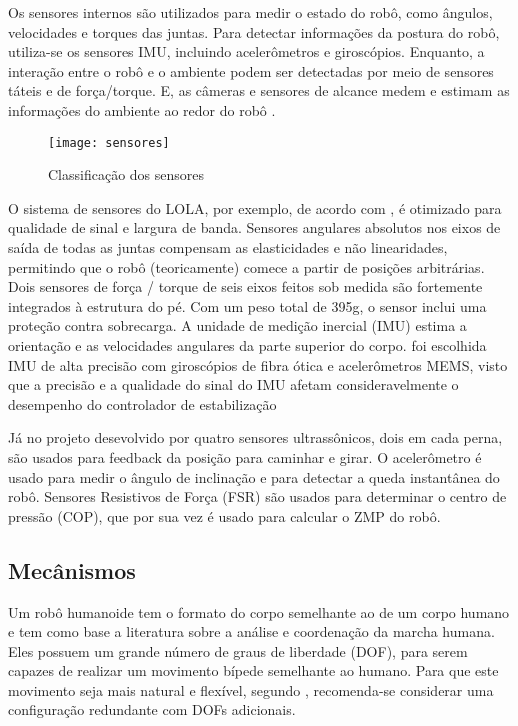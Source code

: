 Os sensores internos são utilizados para medir o estado do robô, como ângulos, velocidades e torques das juntas. Para detectar informações da postura do robô, utiliza-se os sensores IMU, incluindo acelerômetros e giroscópios. Enquanto, a interação entre o robô e o ambiente podem ser detectadas por meio de sensores táteis e de força/torque. E, as câmeras e sensores de alcance medem e estimam as informações do ambiente ao redor do robô \cite{Ambarish20181}.

\begin{figure} [H]
    \centering
    \caption{Classificação dos sensores}
    \texttt{[image: sensores]}
    \label{fig:sensors}
\end{figure}

O sistema de sensores do LOLA, por exemplo, de acordo com ,  é otimizado para qualidade de sinal e largura de banda. Sensores angulares absolutos nos eixos de saída de todas as juntas compensam as elasticidades e não linearidades, permitindo que o robô (teoricamente) comece a partir de posições arbitrárias. Dois sensores de força / torque de seis eixos feitos sob medida são fortemente integrados à estrutura do pé. Com um peso total de 395g, o sensor inclui uma proteção contra sobrecarga. A unidade de medição inercial (IMU) estima a orientação e as velocidades angulares da parte superior do corpo. foi escolhida IMU de alta precisão com giroscópios de fibra ótica e acelerômetros MEMS, visto que a precisão e a qualidade do sinal do IMU afetam consideravelmente o desempenho do controlador de estabilização


Já no projeto desevolvido por  quatro sensores ultrassônicos, dois em cada perna, são usados para feedback da posição para caminhar e girar. O acelerômetro é usado para medir o ângulo de inclinação e para detectar a queda instantânea do robô. Sensores Resistivos de Força (FSR) são usados para determinar o centro de pressão (COP), que por sua vez é usado para calcular o ZMP do robô.


\subsection{Mecânismos}
\label{ssec:mec}

Um robô humanoide tem o formato do corpo semelhante ao de um corpo humano e tem como base a literatura sobre a análise e coordenação da marcha humana. Eles possuem um grande número de graus de liberdade (DOF), para serem capazes de realizar um movimento bípede semelhante ao humano. Para que este movimento seja mais natural e flexível, segundo , recomenda-se considerar uma configuração redundante com DOFs adicionais.

